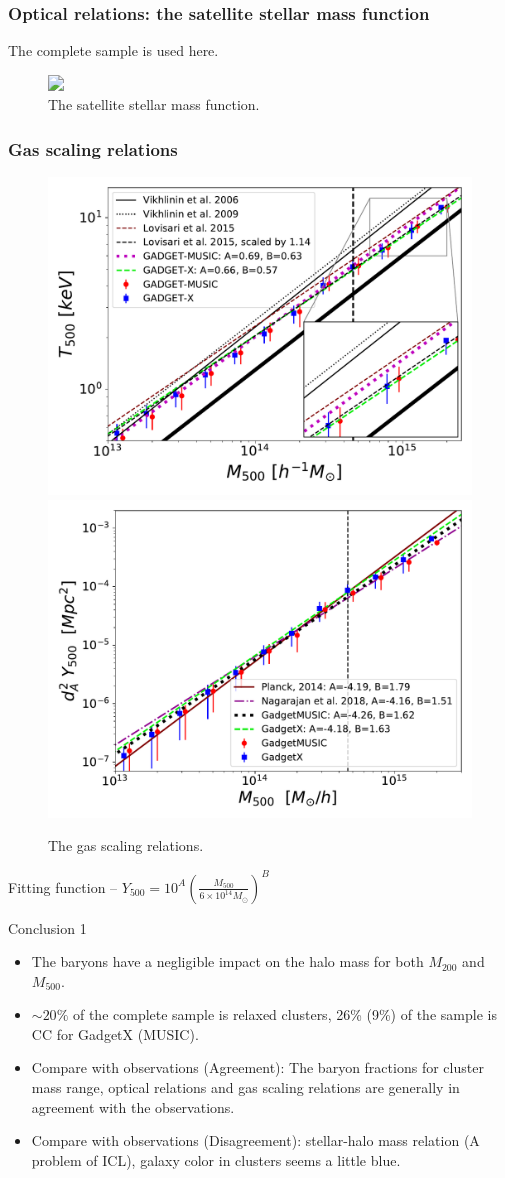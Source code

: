 \documentclass[aspectratio=43]{beamer}
\begin{document}
\begin{frame}
  \frametitle{Optical relations: the satellite stellar mass function}
  The complete sample is used here.
  \begin{figure}
    \includegraphics<1>[width=0.7\linewidth]{Ssmf}
    \vspace{-0.6cm}
    \caption{The satellite stellar mass function.  }
  \end{figure}
\end{frame}

\begin{frame}
  \frametitle{Gas scaling relations}
  \begin{figure}
    \includegraphics[width=0.48\linewidth]{T-M-relations}
    \includegraphics[width=0.48\linewidth]{YM_relation}
    \vspace{-0.4cm}
    \caption{The gas scaling relations.}
  \end{figure}

\begin{center}
  Fitting function -- $Y_{500} = 10^A (\frac{M_{500}}{6\times10^{14} M_{\odot}})^B$
\end{center}
\end{frame}

\begin{frame}{Conclusion 1}
  {
  \begin{itemize}
    \item The baryons have a negligible impact on the halo mass for both $M_{200}$ and $M_{500}$.
    \item $\sim 20 \%$ of the complete sample is relaxed clusters, 26\% (9\%) of the sample is CC for GadgetX (MUSIC).
    \item Compare with observations (Agreement): The baryon fractions for cluster mass range, optical relations and gas scaling relations are generally in agreement with the observations.
    \item Compare with observations (Disagreement):  stellar-halo mass relation (A problem of ICL), galaxy color in clusters seems a little blue.
  \end{itemize}}
\end{frame}
\end{document}
